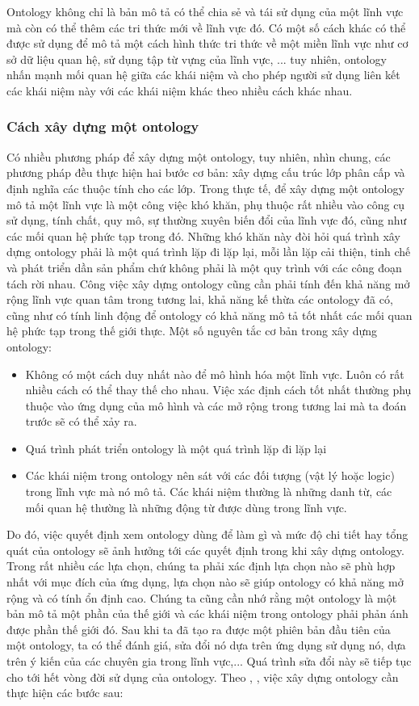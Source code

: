 Ontology không chỉ là bản mô tả có thể chia sẻ và tái sử dụng của một lĩnh vực mà còn có thể thêm các tri thức mới về lĩnh vực đó. 
Có một số cách khác có thể được sử dụng để mô tả một cách hình thức tri thức về một miền lĩnh vực như cơ sở dữ liệu quan hệ, sử dụng tập từ vựng của lĩnh vực, ... tuy nhiên, ontology nhấn mạnh mối quan hệ giữa các khái niệm và cho phép người sử dụng liên kết các khái niệm này với các khái niệm khác theo nhiều cách khác nhau. 
\subsubsection{Cách xây dựng một ontology}
Có nhiều phương pháp để xây dựng một ontology, tuy nhiên, nhìn chung, các phương pháp đều thực hiện hai bước cơ bản: xây dựng cấu trúc lớp phân cấp và định nghĩa các thuộc tính cho các lớp. Trong thực tế, để xây dựng một ontology mô tả một lĩnh vực là một công việc khó khăn, phụ thuộc rất nhiều vào công cụ sử dụng, tính chất, quy mô, sự thường xuyên biến đổi của lĩnh vực đó, cũng như các mối quan hệ phức tạp trong đó. Những khó khăn này đòi hỏi quá trình xây dựng ontology phải là một quá trình lặp đi lặp lại, mỗi lần lặp cải thiện, tinh chế và phát triển dần sản phẩm chứ không phải là một quy trình với các công đoạn tách rời nhau. Công việc xây dựng ontology cũng cần phải tính đến khả năng mở rộng lĩnh vực quan tâm trong tương lai, khả năng kế thừa các ontology đã có, cũng như có tính linh động để ontology có khả năng mô tả tốt nhất các mối quan hệ phức tạp trong thế giới thực. 
Một số nguyên tắc cơ bản trong xây dựng ontology:
\begin{itemize}
	\item Không có một cách duy nhất nào để mô hình hóa một lĩnh vực. Luôn có rất nhiều cách có thể thay thế cho nhau. Việc xác định cách tốt nhất thường phụ thuộc vào ứng dụng của mô hình và các mở rộng trong tương lai mà ta đoán trước sẽ có thể xảy ra.
	\item Quá trình phát triển ontology là một quá trình lặp đi lặp lại
	\item Các khái niệm trong ontology nên sát với các đối tượng (vật lý hoặc logic) trong lĩnh vực mà nó mô tả. Các khái niệm thường là những danh từ, các mối quan hệ thường là những động từ được dùng trong lĩnh vực.
\end{itemize}

Do đó, việc quyết định xem ontology dùng để làm gì và mức độ chi tiết hay tổng quát của ontology sẽ ảnh hưởng tới các quyết định trong khi xây dựng ontology. Trong rất nhiều các lựa chọn, chúng ta phải xác định lựa chọn nào sẽ phù hợp nhất với mục đích của ứng dụng, lựa chọn nào sẽ giúp ontology có khả năng mở rộng và có tính ổn định cao. Chúng ta cũng cần nhớ rằng một ontology là một bản mô tả một phần của thế giới và các khái niệm trong ontology phải phản ánh được phần thế giới đó. Sau khi ta đã tạo ra được một phiên bản đầu tiên của một ontology, ta có thể đánh giá, sửa đổi nó dựa trên ứng dụng sử dụng nó,  dựa trên ý kiến của các chuyên gia trong lĩnh vực,... Quá trình sửa đổi này sẽ tiếp tục cho tới hết vòng đời sử dụng của ontology.
Theo \cite{howtocreateontology1}, \cite{howtocreateontology2}, việc xây dựng ontology cần thực hiện các bước sau:

